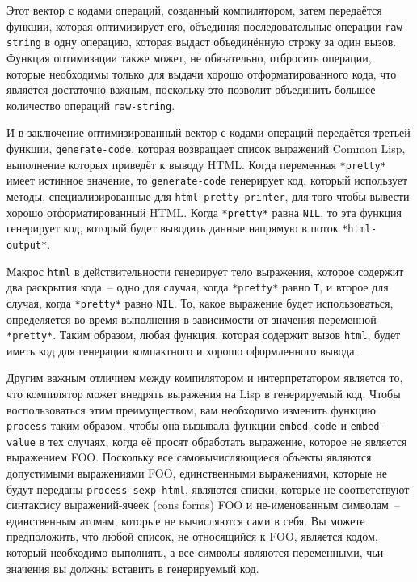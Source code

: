Этот вектор с кодами операций, созданный компилятором, затем передаётся функции, которая
оптимизирует его, объединяя последовательные операции \lstinline{raw-string} в одну операцию,
которая выдаст объединённую строку за один вызов. Функция оптимизации также может, не
обязательно, отбросить операции, которые необходимы только для выдачи хорошо
отформатированного кода, что является достаточно важным, поскольку это позволит объединить
большее количество операций \lstinline{raw-string}.

И в заключение оптимизированный вектор с кодами операций передаётся третьей функции,
\lstinline{generate-code}, которая возвращает список выражений Common Lisp, выполнение которых
приведёт к выводу HTML.  Когда переменная \lstinline{*pretty*} имеет истинное значение, то
\lstinline{generate-code} генерирует код, который использует методы, специализированные для
\lstinline{html-pretty-printer}, для того чтобы вывести хорошо отформатированный HTML. Когда
\lstinline{*pretty*} равна \lstinline{NIL}, то эта функция генерирует код, который будет выводить
данные напрямую в поток \lstinline{*html-output*}.

Макрос \lstinline{html} в действительности генерирует тело выражения, которое содержит два
раскрытия кода~-- одно для случая, когда \lstinline{*pretty*} равно \lstinline{T}, и второе для
случая, когда \lstinline{*pretty*} равно \lstinline{NIL}.  То, какое выражение будет использоваться,
определяется во время выполнения в зависимости от значения переменной \lstinline{*pretty*}.
Таким образом, любая функция, которая содержит вызов \lstinline{html}, будет иметь код для
генерации компактного и хорошо оформленного вывода.

Другим важным отличием между компилятором и интерпретатором является то, что компилятор
может внедрять выражения на Lisp в генерируемый код.  Чтобы воспользоваться этим
преимуществом, вам необходимо изменить функцию \lstinline{process} таким образом, чтобы
она вызывала функции \lstinline{embed-code} и \lstinline{embed-value} в тех случаях, когда
её просят обработать выражение, которое не является выражением FOO. Поскольку все
самовычисляющиеся объекты являются допустимыми выражениями FOO, единственными выражениями,
которые не будут переданы \lstinline{process-sexp-html}, являются списки, которые не
соответствуют синтаксису выражений-ячеек (cons forms) FOO и не-именованным символам~--
единственным атомам, которые не вычисляются сами в себя.  Вы можете предположить, что
любой список, не относящийся к FOO, является кодом, который необходимо выполнять, а все
символы являются переменными, чьи значения вы должны вставить в генерируемый код.

